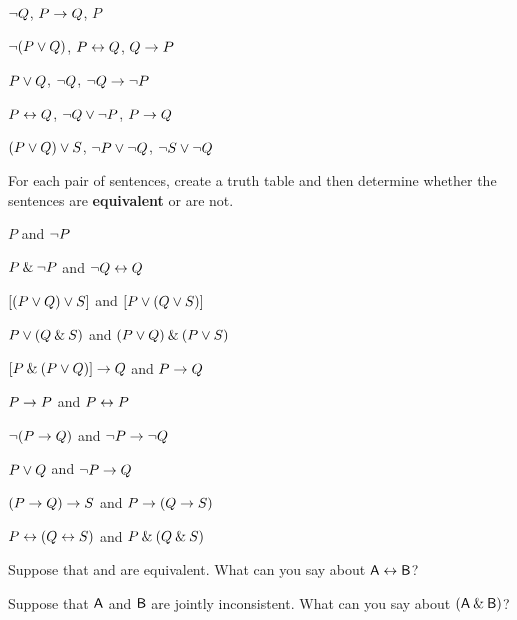 \begin{small}
\begin{earg}
\item ${\neg} Q$, $P \rightarrow Q$, $P$ \vspace{.5ex}%
\item ${\neg}(P \vee Q)$, $P \leftrightarrow Q$, $Q \rightarrow P$\vspace{.5ex} %
\item $P \vee Q$, ${\neg} Q$, ${\neg} Q \rightarrow {\neg} P$\vspace{.5ex} %
\item $P \leftrightarrow Q$, ${\neg} Q \vee {\neg} P$, $P \rightarrow Q$\vspace{.5ex} %
\item $(P \vee Q) \vee S$, ${\neg} P \vee {\neg} Q$, ${\neg} S \vee {\neg} Q$\vspace{.5ex} %
\end{earg}

\newpage

\problempart
\label{pr.TT.equiv}
For each pair of sentences, create a truth table and then determine whether the sentences are \textbf{equivalent} or are not. 
\begin{earg}
\item $P$ and ${\neg} P$
\item $P \mathbin{\&} {\neg} P$ and ${\neg} Q \leftrightarrow Q$
\item $[(P \vee Q) \vee S]$ and $[P \vee (Q \vee S)]$
\item $P \vee (Q \mathbin{\&} S)$ and $(P \vee Q) \mathbin{\&} (P \vee S)$
\item $[P \mathbin{\&} (P \vee Q)] \rightarrow Q$ and $P \rightarrow Q$


\item $P\rightarrow P$ and $P \leftrightarrow P$
\item ${\neg}(P \rightarrow Q)$ and ${\neg} P \rightarrow {\neg} Q$
\item $P \vee Q$ and ${\neg} P \rightarrow Q$
\item$(P \rightarrow Q) \rightarrow S$ and $P \rightarrow (Q \rightarrow S)$
\item $P \leftrightarrow (Q \leftrightarrow S)$ and $P \mathbin{\&} (Q \mathbin{\&} S)$
\end{earg}


\problempart
\label{pr.TT.concepts}
\begin{earg}
\item Suppose that  and  are equivalent. What can you say about $\mathsf{A}\leftrightarrow\mathsf{B}$?

\item Suppose that $\mathsf{A}$ and $\mathsf{B}$ are jointly inconsistent. What can you say about $(\mathsf{A}\mathbin{\&}\mathsf{B})$?


\end{earg}
\end{small}
